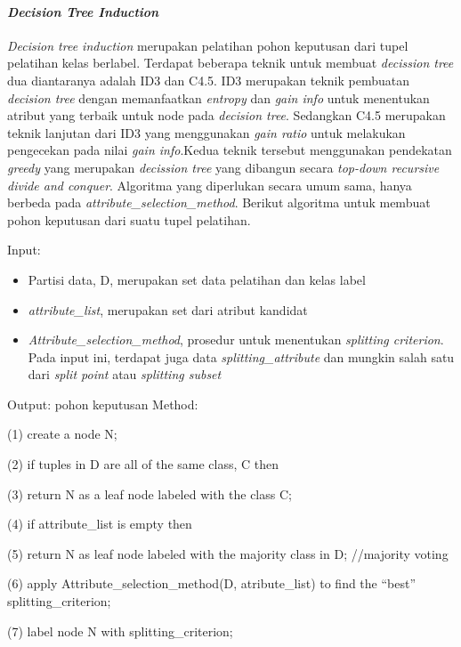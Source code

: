 \paragraph{\textsl{Decision Tree Induction}}

\textsl{Decision tree induction} merupakan pelatihan pohon keputusan dari tupel pelatihan kelas berlabel. Terdapat beberapa teknik untuk membuat \textsl{decission tree} dua diantaranya adalah ID3 dan C4.5. ID3 merupakan teknik pembuatan \textsl{decision tree} dengan memanfaatkan \textsl{entropy} dan \textsl{gain info} untuk menentukan atribut yang terbaik untuk node pada \textsl{decision tree}. Sedangkan C4.5 merupakan teknik lanjutan dari ID3 yang menggunakan \textsl{gain ratio} untuk melakukan pengecekan pada nilai \textsl{gain info}.Kedua teknik tersebut menggunakan pendekatan \textsl{greedy} yang merupakan \textsl{decission tree} yang dibangun secara \textsl{top-down recursive divide and conquer}. Algoritma yang diperlukan secara umum sama, hanya berbeda pada \textsl{attribute\_selection\_method}. Berikut algoritma untuk membuat pohon keputusan dari suatu tupel pelatihan.

Input:
\begin{itemize}
	\item Partisi data, D, merupakan set data pelatihan dan kelas label
	\item \textsl{attribute\_list}, merupakan set dari atribut kandidat
	\item \textsl{Attribute\_selection\_method}, prosedur untuk menentukan \textsl{splitting criterion}. Pada input ini, terdapat juga data \textsl{splitting\_attribute} dan mungkin salah satu dari \textsl{split point} atau \textsl{splitting subset}
\end{itemize}

Output: pohon keputusan
\label{method_pohon_keputusan}
Method:

(1) create a node N;

(2) if tuples in D are all of the same class, C then

(3)	return N as a leaf node labeled with the class C;

(4)	if attribute\_list is empty then

(5) return N as leaf node labeled with the majority class in D; //majority voting

(6)	apply Attribute\_selection\_method(D, atribute\_list) to find the "`best"' splitting\_criterion;

(7) label node N with splitting\_criterion;

